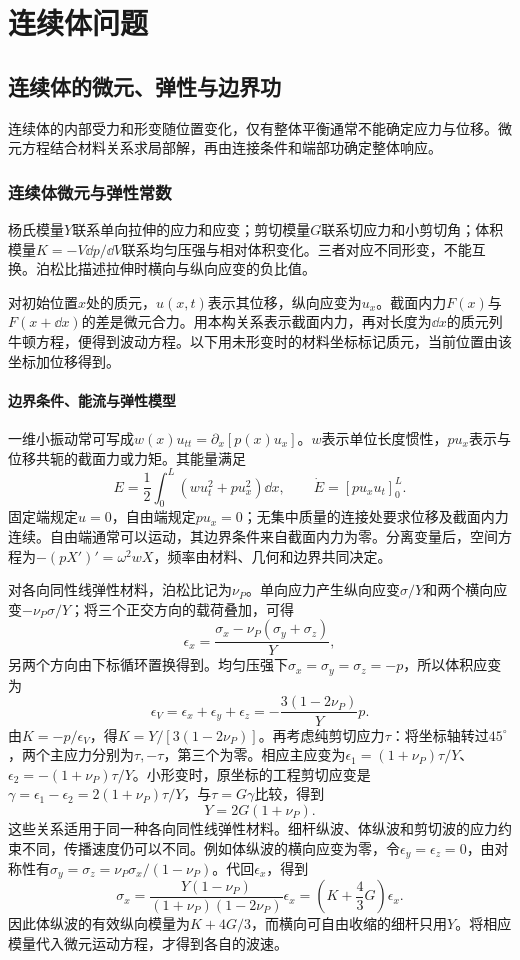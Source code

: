 \chapter{连续体问题}



\section{连续体的微元、弹性与边界功}

连续体的内部受力和形变随位置变化，仅有整体平衡通常不能确定应力与位移。微元方程结合材料关系求局部解，再由连接条件和端部功确定整体响应。



\subsection{连续体微元与弹性常数}
杨氏模量$Y$联系单向拉伸的应力和应变；剪切模量$G$联系切应力和小剪切角；体积模量$K=-V\dd p/\dd V$联系均匀压强与相对体积变化。三者对应不同形变，不能互换。泊松比描述拉伸时横向与纵向应变的负比值。

对初始位置$x$处的质元，$u(x,t)$表示其位移，纵向应变为$u_x$。截面内力$F(x)$与$F(x+\dd x)$的差是微元合力。用本构关系表示截面内力，再对长度为$\dd x$的质元列牛顿方程，便得到波动方程。以下用未形变时的材料坐标标记质元，当前位置由该坐标加位移得到。
\subsubsection{边界条件、能流与弹性模型}
一维小振动常可写成$w(x)u_{tt}=\partial_x[p(x)u_x]$。$w$表示单位长度惯性，$pu_x$表示与位移共轭的截面力或力矩。其能量满足
\[
 E=\frac12\int_0^L(wu_t^2+pu_x^2)\dd x,\qquad
 \dot E=[pu_xu_t]_0^L.
\]
固定端规定$u=0$，自由端规定$pu_x=0$；无集中质量的连接处要求位移及截面内力连续。自由端通常可以运动，其边界条件来自截面内力为零。分离变量后，空间方程为$-(pX')'=\omega^2wX$，频率由材料、几何和边界共同决定。

对各向同性线弹性材料，泊松比记为$\nu_P$。单向应力产生纵向应变$\sigma/Y$和两个横向应变$-\nu_P\sigma/Y$；将三个正交方向的载荷叠加，可得
\[
 \epsilon_x=\frac{\sigma_x-\nu_P(\sigma_y+\sigma_z)}Y,
\]
另两个方向由下标循环置换得到。均匀压强下$\sigma_x=\sigma_y=\sigma_z=-p$，所以体积应变为
\[
 \epsilon_V=\epsilon_x+\epsilon_y+\epsilon_z
 =-\frac{3(1-2\nu_P)}Yp.
\]
由$K=-p/\epsilon_V$，得$K=Y/[3(1-2\nu_P)]$。再考虑纯剪切应力$\tau$：将坐标轴转过$45^\circ$，两个主应力分别为$\tau,-\tau$，第三个为零。相应主应变为$\epsilon_1=(1+\nu_P)\tau/Y$、$\epsilon_2=-(1+\nu_P)\tau/Y$。小形变时，原坐标的工程剪切应变是$\gamma=\epsilon_1-\epsilon_2=2(1+\nu_P)\tau/Y$，与$\tau=G\gamma$比较，得到
\[
 Y=2G(1+\nu_P).
\]
这些关系适用于同一种各向同性线弹性材料。细杆纵波、体纵波和剪切波的应力约束不同，传播速度仍可以不同。例如体纵波的横向应变为零，令$\epsilon_y=\epsilon_z=0$，由对称性有$\sigma_y=\sigma_z=\nu_P\sigma_x/(1-\nu_P)$。代回$\epsilon_x$，得到
\[
 \sigma_x=\frac{Y(1-\nu_P)}{(1+\nu_P)(1-2\nu_P)}\epsilon_x
 =\left(K+\frac43G\right)\epsilon_x.
\]
因此体纵波的有效纵向模量为$K+4G/3$，而横向可自由收缩的细杆只用$Y$。将相应模量代入微元运动方程，才得到各自的波速。

